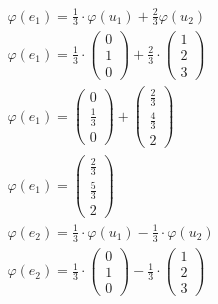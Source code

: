 \begin{align*}
    \varphi(e_1) = \frac{1}{3} \cdot \varphi(u_1) + \frac{2}{3} \varphi(u_2)          \\
    \varphi(e_1) = \frac{1}{3} \cdot \begin{pmatrix}
                                         0 \\ 1 \\ 0
                                     \end{pmatrix} + \frac{2}{3} \cdot \begin{pmatrix}
                                                                           1 \\ 2 \\ 3
                                                                       \end{pmatrix} \\
    \varphi(e_1) = \begin{pmatrix}
                       0 \\ \frac{1}{3} \\ 0
                   \end{pmatrix} + \begin{pmatrix}
                                       \frac{2}{3} \\ \frac{4}{3} \\ 2
                                   \end{pmatrix}                     \\
    \varphi(e_1) = \begin{pmatrix}
                       \frac{2}{3} \\ \frac{5}{3} \\ 2
                   \end{pmatrix}                                    \\
    \varphi(e_2) = \frac{1}{3} \cdot \varphi(u_1) - \frac{1}{3} \cdot \varphi(u_2)    \\
    \varphi(e_2) = \frac{1}{3} \cdot \begin{pmatrix}
                                         0 \\ 1 \\ 0
                                     \end{pmatrix} -\frac{1}{3} \cdot \begin{pmatrix}
                                                                          1 \\ 2 \\ 3
                                                                      \end{pmatrix}  \\

\end{align*}
